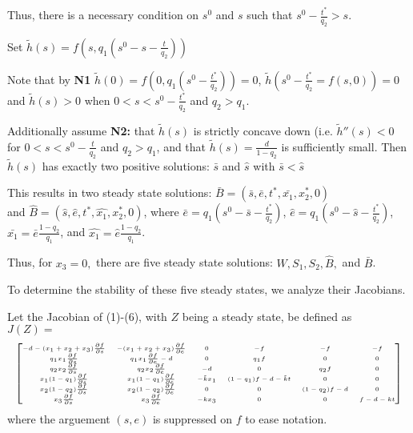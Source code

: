\documentclass[12pt]{article}
\begin{document}
\noindent Thus, there is a necessary condition on $s^0$ and $s$ such that $s^0- \frac{t^*}{q_2}>s.$

\noindent Set $\tilde{h}(s)=f(s,q_1(s^0-s-\frac{t}{q_2}))$

\noindent Note that by \textbf{N1} $\tilde{h}(0)=f(0,q_1(s^0 - \frac{t^*}{q_2}))=0$, $\tilde{h}(s^0-\frac{t^*}{q_2}=f(s,0))=0$ and $\tilde{h}(s)>0$ when $0<s<s^0 - \frac{t^*}{q_2}$ and $q_2>q_1$. 

\noindent Additionally assume \textbf{N2:} that $\tilde{h}(s)$ is strictly concave down (i.e. $\tilde{h}''(s)<0$ for $0<s<s^0 - \frac{t}{q_2}$ and $q_2>q_1$, and that $\tilde{h}(s)=\frac{d}{1-q_2}$ is sufficiently small. Then $\tilde{h}(s)$ has exactly two positive solutions: $\bar{s}$ and $\hat{s}$ with $\bar{s}< \hat{s}$

\noindent This results in two steady state solutions: $\bar{B}=(\bar{s}, \bar{e}, t^*, \bar{x_1}, x_2^*,0)$\\ and $\hat{B}=(\hat{s}, \hat{e}, t^*, \hat{x_1}, x_2^*,0)$, where $\bar{e} = q_1(s^0-\bar{s}-\frac{t^*}{q_2})$, $\hat{e} = q_1(s^0-\hat{s}-\frac{t^*}{q_2})$, $\bar{x_1}=\bar{e} \frac{1-q_2}{q_1}$, and $\hat{x_1}=\hat{e} \frac{1-q_2}{q_1}$. 


\noindent Thus, for $x_3=0,$ there are five steady state solutions: $W, S_1, S_2, \hat{B},$ and $\bar{B}$. 

\noindent To determine the stability of these five steady states, we analyze their Jacobians. 

\noindent Let the Jacobian of (1)-(6), with $Z$ being a steady state, be defined as\\ $J(Z)=$
\[ 
\tiny
\begin{bmatrix}
-d-(x_1 +x_2+x_3)\frac{\partial f}{\partial s} & -(x_1+x_2+x_3)\frac{\partial f}{\partial e} & 0 & -f & -f & -f\\
q_1 x_1 \frac{\partial f}{\partial s} & q_1 x_1 \frac{\partial f}{\partial e}-d & 0 & q_1 f & 0 & 0 \\
q_2 x_2 \frac{\partial f}{\partial s} & q_2 x_2 \frac{\partial f}{\partial e} & -d & 0 & q_2 f & 0 \\
x_1 (1-q_1)\frac{\partial f}{\partial s} & x_1(1-q_1)\frac{\partial f}{\partial e} & -\tilde{k} x_1 & (1-q_1) f-d-\tilde{k}t & 0 & 0 \\
x_2 (1-q_2) \frac{\partial f}{\partial s} & x_2(1-q_2)\frac{\partial f}{\partial e} & 0 & 0 & (1-q_2) f-d & 0 \\
x_3 \frac{\partial f}{\partial s} & x_3 \frac{\partial f}{\partial e} & -k x_3 & 0 & 0 & f-d-kt
\end{bmatrix}
\]
where the arguement $(s,e)$ is suppressed on $f$ to ease notation. 
\end{document}
